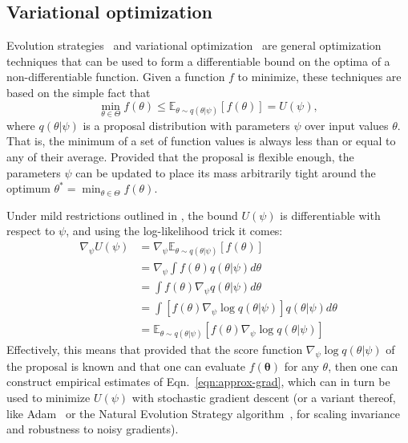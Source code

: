 \documentclass[twocolumn,superscriptaddress,aps]{revtex4-1}
\theoremstyle{plain}
\begin{document}
\subsection{Variational optimization}

Evolution strategies~\citep{2011arXiv1106.4487W} and variational optimization~\cite{2012arXiv1212.4507S} are general
optimization techniques that can be used to form a differentiable bound
on the optima of a non-differentiable function. Given a function $f$ to minimize,
these techniques are based on the simple fact that
\begin{equation}
    \min_{\theta \in \Theta} f(\theta) \leq \mathbb{E}_{\theta \sim q(\theta|\psi)} [f(\theta)] = U(\psi),
\end{equation}
where $q(\theta|\psi)$ is a proposal distribution with parameters $\psi$ over input values $\theta$.
That is, the minimum of a set of function values is always less than or equal
to any of their average. Provided that the proposal is flexible enough, the parameters $\psi$
can be updated to place its mass arbitrarily tight around the optimum $\theta^* = \min_{\theta \in \Theta} f(\theta)$.

Under mild restrictions outlined in  \citep{2012arXiv1212.4507S}, the bound
$U(\psi)$ is differentiable with respect to $\psi$, and using the log-likelihood
trick it comes:
\begin{align}\label{eqn:approx-grad}
    \nabla_\psi U(\psi) &= \nabla_\psi \mathbb{E}_{\theta \sim q(\theta|\psi)} [f(\theta)] \nonumber \\
    &= \nabla_\psi \int f(\theta)  q(\theta|\psi)  d\theta \nonumber \\
    &= \int f(\theta) \nabla_\psi q(\theta|\psi)  d\theta \nonumber \\
    &= \int \left[ f(\theta) \nabla_\psi \log q(\theta|\psi) \right]  q(\theta|\psi) d\theta \nonumber \\
    &= \mathbb{E}_{\theta \sim q(\theta|\psi)} [f(\theta) \nabla_\psi \log q(\theta|\psi)]
\end{align}
Effectively, this means that provided that the score function $\nabla_\psi \log
q(\theta|\psi)$ of the proposal is known and that one can evaluate
$f(\mathbf{\theta})$ for any $\theta$, then one can construct empirical
estimates of Eqn.~\ref{eqn:approx-grad}, which can in turn be used to minimize
$U(\psi)$ with stochastic gradient descent (or a variant thereof, like
Adam~\cite{2014arXiv1412.6980K} or the Natural Evolution Strategy
algorithm~\citep{2011arXiv1106.4487W}, for scaling invariance and
robustness to noisy gradients).
\end{document}
